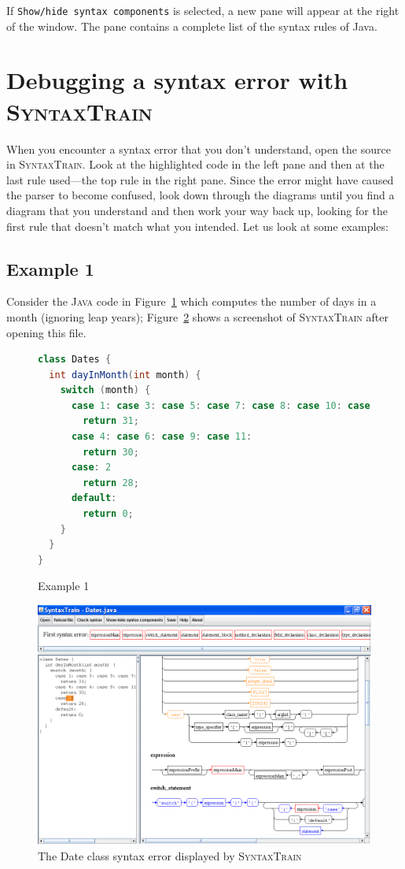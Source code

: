 \documentclass[11pt]{article}
\newcommand*{\st}{\textsc{SyntaxTrain}}
\newcommand*{\jv}{\textsc{Java}}
\begin{document}
If \texttt{Show/hide syntax components} is selected, a new pane will
appear at the right of the window. The pane contains a complete list of
the syntax rules of Java.


\section{Debugging a syntax error with \st{}}

When you encounter a syntax error that you don't understand, open the
source in \st{}. Look at the highlighted code in the left pane and then
at the last rule used---the top rule in the right pane. Since the error
might have caused the parser to become confused, look down through the
diagrams until you find a diagram that you understand and then work your
way back up, looking for the first rule that doesn't match what you
intended. Let us look at some examples:

\subsection{Example 1}

Consider the \jv{} code in Figure~\ref{fig.err} which computes the
number of days in a month (ignoring leap years); Figure~\ref{fig.scr}
shows a screenshot of \st{} after opening this file.

\begin{figure}[htbp]
\begin{center}
\begin{lstlisting}[language=Java]
class Dates {
  int dayInMonth(int month) {
    switch (month) {
      case 1: case 3: case 5: case 7: case 8: case 10: case 12:
        return 31;
      case 4: case 6: case 9: case 11:
        return 30;
      case: 2
        return 28;
      default:
        return 0;
    }
  }
}
\end{lstlisting}
\end{center}
\caption{Example 1}\label{fig.err}
\end{figure}

\begin{figure}[htbp]
\begin{center}
\includegraphics[width=.8\textwidth,keepaspectratio=fixed]{switchCase.png}
\end{center}
\caption{The Date class syntax error displayed by \st{}}\label{fig.scr}
\end{figure}
\end{document}
